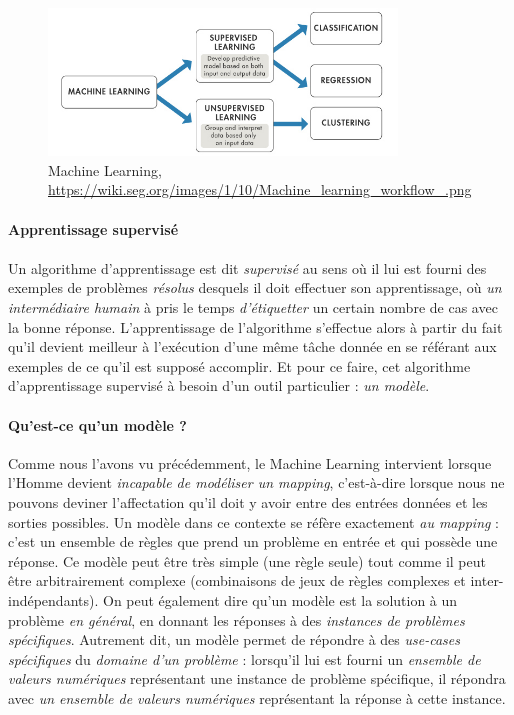 \begin{figure}[h]
    \centering
    \includegraphics[width=350px]{chapters/03/images/machine-learning.png}
    \caption{\label{machine learning}Machine Learning, \url{https://wiki.seg.org/images/1/10/Machine_learning_workflow_.png}}
\end{figure}

\paragraph{Apprentissage supervisé}

\paragraph{} Un algorithme d'apprentissage est dit \emph{supervisé} au sens où il lui est fourni des exemples de problèmes \emph{résolus} desquels
il doit effectuer son apprentissage, où \emph{un intermédiaire humain} à pris le temps \emph{d'étiquetter} un certain nombre de cas avec la bonne réponse.
L'apprentissage de l'algorithme s'effectue alors à partir du fait qu'il devient meilleur à l'exécution d'une même tâche donnée en se référant aux exemples
de ce qu'il est supposé accomplir. Et pour ce faire, cet algorithme d'apprentissage supervisé à besoin d'un outil particulier : \emph{un modèle}.

\paragraph{Qu'est-ce qu'un modèle ?} Comme nous l'avons vu précédemment, le Machine Learning intervient lorsque l'Homme devient \emph{incapable de modéliser un mapping},
c'est-à-dire lorsque nous ne pouvons deviner l'affectation qu'il doit y avoir entre des entrées données et les sorties possibles. Un modèle dans ce contexte se réfère 
exactement \emph{au mapping} : c'est un ensemble de règles que prend un problème en entrée et qui possède une réponse. Ce modèle peut être très simple (une règle seule)
tout comme il peut être arbitrairement complexe (combinaisons de jeux de règles complexes et inter-indépendants). On peut également dire qu'un modèle est la solution à un problème
\emph{en général}, en donnant les réponses à des \emph{instances de problèmes spécifiques}. Autrement dit, un modèle permet de répondre à des \emph{use-cases spécifiques} du
\emph{domaine d'un problème} \cite{MachineLearning3} : lorsqu'il lui est fourni un \emph{ensemble de valeurs numériques} représentant une instance de problème spécifique, il répondra
avec \emph{un ensemble de valeurs numériques} représentant la réponse à cette instance.

